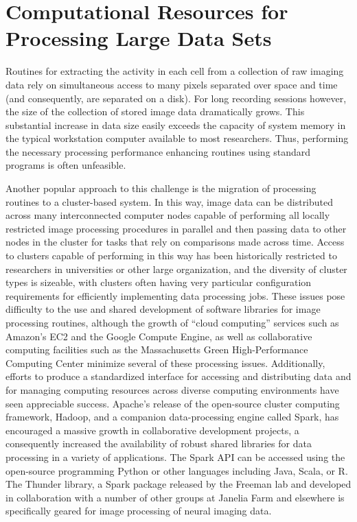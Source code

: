 \documentclass[
  12pt,
]{report}
\numberwithin{figure}{section}
\numberwithin{table}{section}
\numberwithin{equations}{section}
\begin{document}
\hypertarget{computational-resources-for-processing-large-data-sets}{%
\section{Computational Resources for Processing Large Data
Sets}\label{computational-resources-for-processing-large-data-sets}}

Routines for extracting the activity in each cell from a collection of
raw imaging data rely on simultaneous access to many pixels separated
over space and time (and consequently, are separated on a disk). For
long recording sessions however, the size of the collection of stored
image data dramatically grows. This substantial increase in data size
easily exceeds the capacity of system memory in the typical workstation
computer available to most researchers. Thus, performing the necessary
processing performance enhancing routines using standard programs is
often unfeasible.

Another popular approach to this challenge is the migration of
processing routines to a cluster-based system. In this way, image data
can be distributed across many interconnected computer nodes capable of
performing all locally restricted image processing procedures in
parallel and then passing data to other nodes in the cluster for tasks
that rely on comparisons made across time. Access to clusters capable of
performing in this way has been historically restricted to researchers
in universities or other large organization, and the diversity of
cluster types is sizeable, with clusters often having very particular
configuration requirements for efficiently implementing data processing
jobs. These issues pose difficulty to the use and shared development of
software libraries for image processing routines, although the growth of
``cloud computing'' services such as Amazon's EC2 and the Google Compute
Engine, as well as collaborative computing facilities such as the
Massachusetts Green High-Performance Computing Center minimize several
of these processing issues. Additionally, efforts to produce a
standardized interface for accessing and distributing data and for
managing computing resources across diverse computing environments have
seen appreciable success. Apache's release of the open-source cluster
computing framework, Hadoop, and a companion data-processing engine
called Spark, has encouraged a massive growth in collaborative
development projects, a consequently increased the availability of
robust shared libraries for data processing in a variety of
applications. The Spark API can be accessed using the open-source
programming Python or other languages including Java, Scala, or R. The
Thunder library, a Spark package released by the Freeman lab and
developed in collaboration with a number of other groups at Janelia Farm
and elsewhere is specifically geared for image processing of neural
imaging data.
\end{document}
